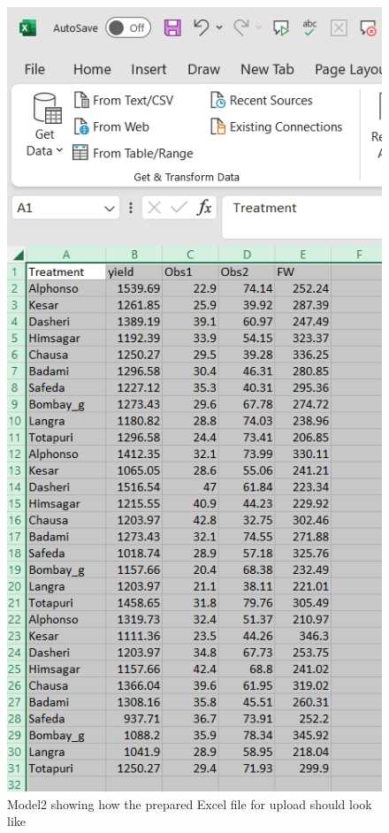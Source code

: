 \documentclass[
  letterpaper,
  DIV=11,
  numbers=noendperiod]{scrartcl}
\begin{document}
\begin{figure}

{\centering \includegraphics{P2.webp}

}

\caption{\label{fig-2}Model2 showing how the prepared Excel file for
upload should look like}

\end{figure}
\end{document}
